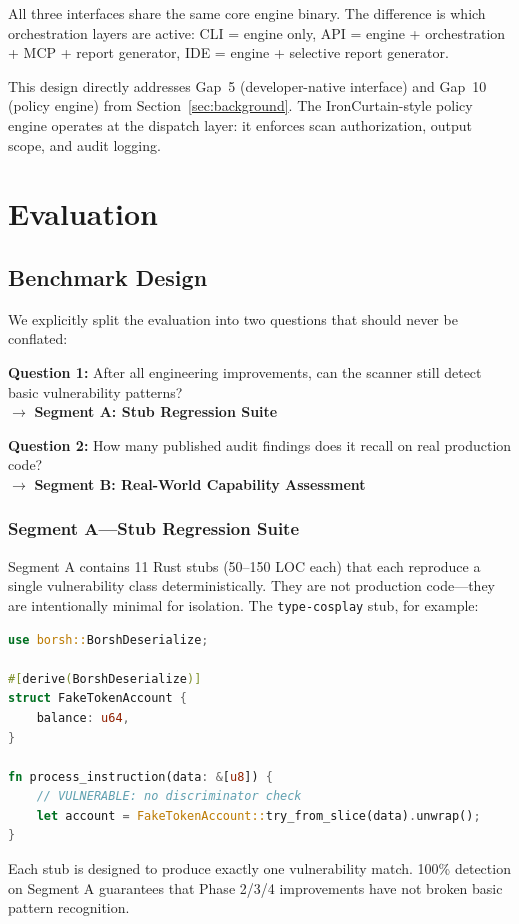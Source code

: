 \documentclass{article}
\begin{document}
All three interfaces share the same core engine binary. The difference is which orchestration layers are active: CLI = engine only, API = engine + orchestration + MCP + report generator, IDE = engine + selective report generator.

This design directly addresses Gap~5 (developer-native interface) and Gap~10 (policy engine) from Section~\ref{sec:background}. The IronCurtain-style policy engine operates at the dispatch layer: it enforces scan authorization, output scope, and audit logging.


\section{Evaluation}
\label{sec:eval}

\subsection{Benchmark Design}
\label{sec:benchmark}

We explicitly split the evaluation into two questions that should never be conflated:

\textbf{Question 1:} After all engineering improvements, can the scanner still detect basic vulnerability patterns?\\
$\to$ \textbf{Segment A: Stub Regression Suite}

\textbf{Question 2:} How many published audit findings does it recall on real production code?\\
$\to$ \textbf{Segment B: Real-World Capability Assessment}

\subsubsection{Segment A---Stub Regression Suite}

Segment A contains 11 Rust stubs (50--150 LOC each) that each reproduce a single vulnerability class deterministically. They are not production code---they are intentionally minimal for isolation. The \texttt{type-cosplay} stub, for example:
\vspace{-2pt}
\begin{lstlisting}[language=Rust]
use borsh::BorshDeserialize;

#[derive(BorshDeserialize)]
struct FakeTokenAccount {
    balance: u64,
}

fn process_instruction(data: &[u8]) {
    // VULNERABLE: no discriminator check
    let account = FakeTokenAccount::try_from_slice(data).unwrap();
}
\end{lstlisting}
\vspace{-2pt}
Each stub is designed to produce exactly one vulnerability match. 100\% detection on Segment A guarantees that Phase 2/3/4 improvements have not broken basic pattern recognition.
\end{document}
